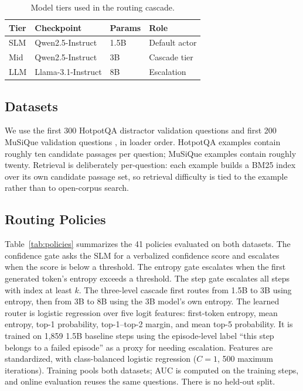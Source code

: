 \documentclass[sigplan,screen,review,anonymous,nonacm]{acmart}
\begin{document}
\begin{table}[t]
\caption{Model tiers used in the routing cascade.}
\label{tab:models}
\centering
\begin{tabular}{llll}
\toprule
Tier & Checkpoint & Params & Role \\
\midrule
SLM & Qwen2.5-Instruct & 1.5B & Default actor \\
Mid & Qwen2.5-Instruct & 3B & Cascade tier \\
LLM & Llama-3.1-Instruct & 8B & Escalation \\
\bottomrule
\end{tabular}
\end{table}

\subsection{Datasets}

We use the first 300 HotpotQA distractor validation questions \cite{hotpotqa}
and first 200 MuSiQue validation questions \cite{musique}, in loader order. HotpotQA examples contain roughly ten candidate passages per
question; MuSiQue examples contain roughly twenty. Retrieval is deliberately
per-question: each example builds a BM25 index over its own candidate passage
set, so retrieval difficulty is tied to the example rather than to open-corpus
search.

\subsection{Routing Policies}

Table~\ref{tab:policies} summarizes the 41 policies evaluated on both
datasets. The confidence gate asks the SLM for a verbalized confidence score
and escalates when the score is below a threshold. The entropy gate escalates
when the first generated token's entropy exceeds a threshold. The step gate
escalates all steps with index at least $k$. The three-level cascade first
routes from 1.5B to 3B using entropy, then from 3B to 8B using the 3B model's
own entropy. The learned router is logistic regression over five logit
features: first-token entropy, mean entropy, top-1 probability, top-1--top-2
margin, and mean top-5 probability. It is trained on 1,859 1.5B baseline
steps using the episode-level label ``this step belongs to a failed episode''
as a proxy for needing escalation. Features are standardized, with
class-balanced logistic regression ($C=1$, 500 maximum iterations).
Training pools both datasets; AUC is computed on the training steps, and
online evaluation reuses the same questions. There is no held-out split.
\end{document}
